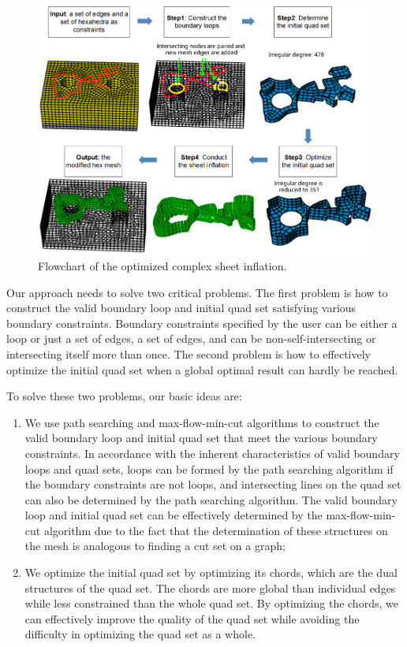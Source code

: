\documentclass[final,5p,times,twocolumn]{elsarticle}
\begin{document}
\begin{figure}[htbp]
\begin{center}
\includegraphics[width=16cm]{overview2.png}
\caption{Flowchart of the optimized complex sheet inflation.}
\label{fig:overview}
\end{center}
\end{figure}

Our approach needs to solve two critical problems. The first problem is how to construct the valid boundary loop and initial quad set satisfying various boundary constraints. Boundary constraints specified by the user can be either a loop or just a set of edges, a set of edges, and can be non-self-intersecting or intersecting itself more than once. The second problem is how to effectively optimize the initial quad set when a global optimal result can hardly be reached.

To solve these two problems, our basic ideas are:
\begin{enumerate}
  \item We use path searching and max-flow-min-cut algorithms to construct the valid boundary loop and initial quad set that meet the various boundary constraints. In accordance with the inherent characteristics of valid boundary loops and quad sets, loops can be formed by the path searching algorithm if the boundary constraints are not loops, and intersecting lines on the quad set can also be determined by the path searching algorithm. The valid boundary loop and initial quad set can be effectively determined by the max-flow-min-cut algorithm due to the fact that the determination of these structures on the mesh is analogous to finding a cut set on a graph;
  \item We optimize the initial quad set by optimizing its chords, which are the dual structures of the quad set. The chords are more global than individual edges while less constrained than the whole quad set. By optimizing the chords, we can effectively improve the quality of the quad set while avoiding the difficulty in optimizing the quad set as a whole.
\end{enumerate}
\end{document}
